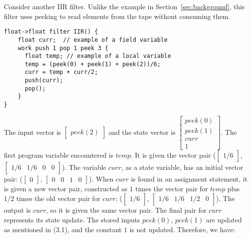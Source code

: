 Consider another IIR filter.  Unlike the example in
Section~\ref{sec:background}, this filter uses peeking to read
elements from the tape without consuming them.

\begin{singlespace}
\small
\begin{verbatim}
float->float filter IIR() {
    float curr;  // example of a field variable
    work push 1 pop 1 peek 3 {
      float temp; // example of a local variable
      temp = (peek(0) + peek(1) + peek(2))/6;
      curr = temp + curr/2;
      push(curr);
      pop();
    }
}
\end{verbatim}
\end{singlespace}
\vspace{-16pt}

\noindent The input vector is $\left [\begin{array} {c} peek(2) \end{array}
\right]$ and the state vector is $\left [\begin{array} {c} peek(0) \\ peek(1) \\ curr \\ 1 \end{array} \right]$. The first program
variable encountered is $temp$. It is given the vector pair
($\left [ \begin{array} {c} 1/6 \end{array} \right ]$, $\left [
\begin{array} {cccc} 1/6 & 1/6 & 0 & 0 \end{array} \right ]$). The
variable $curr$, as a state variable, has an initial vector pair:
($\left [ \begin{array} {c} 0 \end{array} \right ]$, $\left
[\begin{array} {cccc} 0 & 0 & 1 & 0
\end{array} \right ]$). When $curr$ is found in an assignment
statement, it is given a new vector pair, constructed as $1$ times
the vector pair for $temp$ plus $1/2$ times the old vector pair
for $curr$: ($\left [ \begin{array} {c} 1/6 \end{array} \right ]$,
$\left [ \begin{array} {cccc} 1/6 & 1/6 & 1/2 & 0 \end{array}
\right ]$). The output is $curr$, so it is given the same vector
pair. The final pair for $curr$ represents its state update. The
stored inputs $peek(0)$, $peek(1)$ are updated as mentioned in
(3.1), and the constant $1$ is not updated. Therefore, we have:


